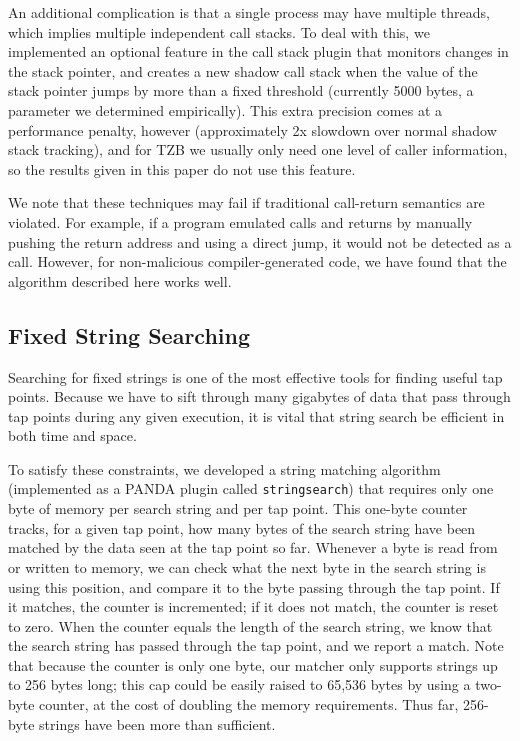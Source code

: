 An additional complication is that a single process may have multiple
threads, which implies multiple independent call stacks. To deal with
this, we implemented an optional feature in the call stack plugin that
monitors changes in the stack pointer, and creates a new shadow call
stack when the value of the stack pointer jumps by more than a fixed
threshold (currently 5000 bytes, a parameter we determined empirically).
This extra precision comes at a performance penalty, however
(approximately 2x slowdown over normal shadow stack tracking), and for
TZB we usually only need one level of caller information, so the results
given in this paper do not use this feature.

We note that these techniques may fail if traditional call-return
semantics are violated. For example, if a program emulated calls and
returns by manually pushing the return address and using a direct jump,
it would not be detected as a call. However, for non-malicious
compiler-generated code, we have found that the algorithm described here
works well.

\subsection{Fixed String Searching}
\label{sec:implementation:subsec:stringsearch}

Searching for fixed strings is one of the most effective tools for
finding useful tap points. Because we have to sift through many
gigabytes of data that pass through tap points during any given
execution, it is vital that string search be efficient in both time and
space.

To satisfy these constraints, we developed a string matching algorithm
(implemented as a PANDA plugin called \texttt{stringsearch}) that
requires only one byte of memory per search string and per tap point.
This one-byte counter tracks, for a given tap point, how many bytes of
the search string have been matched by the data seen at the tap point so
far. Whenever a byte is read from or written to memory, we can check
what the next byte in the search string is using this position, and
compare it to the byte passing through the tap point. If it matches, the
counter is incremented; if it does not match, the counter is reset to
zero. When the counter equals the length of the search string, we know
that the search string has passed through the tap point, and we report a
match. Note that because the counter is only one byte, our matcher only
supports strings up to 256 bytes long; this cap could be easily raised
to 65,536 bytes by using a two-byte counter, at the cost of doubling the
memory requirements. Thus far, 256-byte strings have been more than
sufficient.

